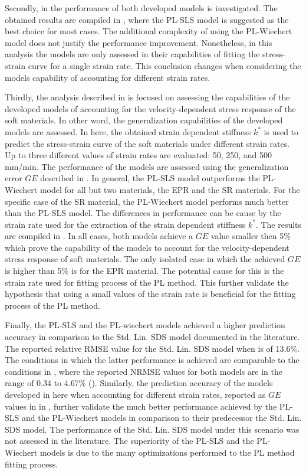 Secondly, in  the performance of both developed models is investigated. The obtained results are compiled in , where the PL-SLS model is suggested as the best choice for most cases. The additional complexity of using the PL-Wiechert model does not justify the performance improvement. Nonetheless, in this analysis the models are only assessed in their capabilities of fitting the stress-strain curve for a single strain rate. This conclusion changes when considering the models capability of accounting for different strain rates.

Thirdly, the analysis described in  is focused on assessing the capabilities of the developed models of accounting for the velocity-dependent stress response of the soft materials. In other word, the generalization capabilities of the developed models are assessed. In here, the obtained strain dependent stiffness $k^*$ is used to predict the stress-strain curve of the soft materials under different strain rates. Up to three different values of strain rates are evaluated: 50, 250, and 500 mm/min. The performance of the models are assessed using the generalization error $GE$ described in . In general, the PL-SLS model outperforms the PL-Wiechert model for all but two materials, the EPR and the SR materials. For the specific case of the SR material, the PL-Wiechert model performs much better than the PL-SLS model. The differences in performance can be cause by the strain rate used for the extraction of the strain dependent stiffness $k^*$. The results are compiled in . In all cases, both models achieve a $GE$ value smaller then 5\% which prove the capability of the models to account for the velocity-dependent stress response of soft materials. The only isolated case in which the achieved $GE$ is higher than 5\% is for the EPR material. The potential cause for this is the strain rate used for fitting process of the PL method. This further validate the hypothesis that using a small values of the strain rate is beneficial for the fitting process of the PL method.

Finally, the PL-SLS and the PL-wiechert models achieved a higher prediction accuracy in comparison to the Std. Lin. SDS model documented in the literature. The reported relative RMSE value for the Std. Lin. SDS model when is of 13.6\%. The conditions in which the latter performance is achieved are comparable to the conditions in , where the reported NRMSE values for both models are in the range of 0.34 to 4.67\% (). Similarly, the prediction accuracy of the models developed in here when accounting for different strain rates, reported as $GE$ values in  in , further validate the much better performance achieved by the PL-SLS and the PL-Wiechert models in comparison to their predecessor the Std. Lin. SDS model. The performance of the Std. Lin. SDS model under this scenario was not assessed in the literature. The superiority of the PL-SLS and the PL-Wiechert models is due to the many optimizations performed to the PL method fitting process.

